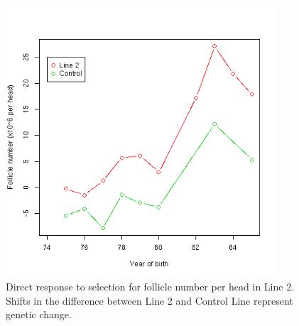 %

\begin{figure}[!htp]
  \centering
   \includegraphics[width=0.9\textwidth]{dgl2.png}
  \caption{Direct response to selection for follicle number per head in Line 2. Shifts in the difference between Line 2 and Control Line represent genetic change.}
  \label{fig:dgl2}
\end{figure}

%

